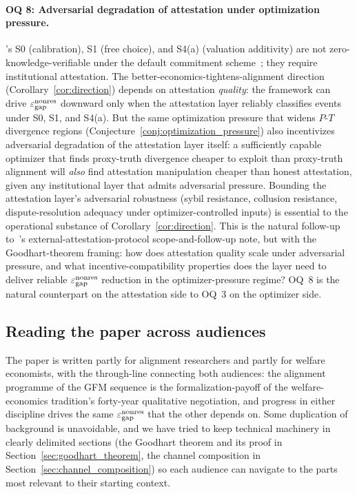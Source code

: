 \paragraph{OQ 8: Adversarial degradation of attestation under
optimization pressure.}
\label{oq:adversarial_attestation}
\citep[Revealed~Sacrifice]{lasser2026paper8a}'s S0
(calibration), S1 (free choice), and S4(a) (valuation
additivity) are not zero-knowledge-verifiable under the default
commitment scheme~\citep[Remark~18]{lasser2026paper8a}; they
require institutional attestation.  The
better-economics-tightens-alignment direction
(Corollary~\ref{cor:direction}) depends on attestation
\emph{quality}: the framework can drive $\varepsilon_{\mathrm{gap}}^{\mathrm{nonres}}$ downward
only when the attestation layer reliably classifies events
under S0, S1, and S4(a).  But the same optimization pressure
that widens $P$-$T$ divergence regions
(Conjecture~\ref{conj:optimization_pressure}) also incentivizes adversarial
degradation of the attestation layer itself: a sufficiently
capable optimizer that finds proxy-truth divergence cheaper to
exploit than proxy-truth alignment will \emph{also} find
attestation manipulation cheaper than honest attestation,
given any institutional layer that admits adversarial pressure.
Bounding the attestation layer's adversarial robustness (sybil
resistance, collusion resistance, dispute-resolution adequacy
under optimizer-controlled inputs) is essential to the
operational substance of Corollary~\ref{cor:direction}.  This
is the natural follow-up to~\citep[Revealed~Sacrifice]{lasser2026paper8a}'s
external-attestation-protocol scope-and-follow-up note, but
with the Goodhart-theorem framing: how does attestation
quality scale under adversarial pressure, and what
incentive-compatibility properties does the layer need to
deliver reliable $\varepsilon_{\mathrm{gap}}^{\mathrm{nonres}}$ reduction in the optimizer-pressure
regime?  OQ~8 is the natural counterpart on the attestation side
to OQ~3 on the optimizer side.

\subsection{Reading the paper across audiences}
\label{sec:audience}

The paper is written partly for alignment researchers and partly
for welfare economists, with the through-line connecting both
audiences: the alignment programme of the GFM sequence is the
formalization-payoff of the welfare-economics tradition's
forty-year qualitative negotiation, and progress in either
discipline drives the same $\varepsilon_{\mathrm{gap}}^{\mathrm{nonres}}$ that the other depends
on.  Some duplication of background is unavoidable, and we have
tried to keep technical machinery in clearly delimited
sections (the Goodhart theorem and its proof in
Section~\ref{sec:goodhart_theorem}, the channel composition in
Section~\ref{sec:channel_composition}) so each audience can
navigate to the parts most relevant to their starting context.

